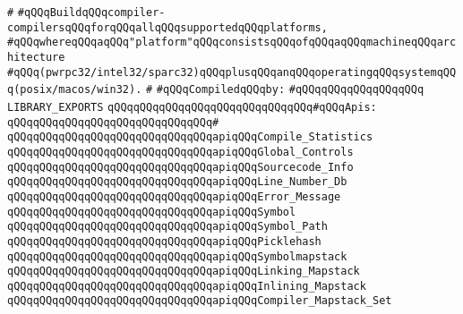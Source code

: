 \label{src/lib/core/compiler/mythryl-compiler-compilers-for-all-supported-platforms.lib}
\verb|#|\newline
\verb|#qQQqBuildqQQqcompiler-compilersqQQqforqQQqallqQQqsupportedqQQqplatforms,|\newline
\verb|#qQQqwhereqQQqaqQQq"platform"qQQqconsistsqQQqofqQQqaqQQqmachineqQQqarchitecture|\newline
\verb|#qQQq(pwrpc32/intel32/sparc32)qQQqplusqQQqanqQQqoperatingqQQqsystemqQQq(posix/macos/win32).|\newline
\verb|#|\newline
\newline
\verb|#qQQqCompiledqQQqby:|\newline
\verb|#qQQqqQQqqQQqqQQqqQQq|\newline
\newline
\newline
\verb|LIBRARY_EXPORTS|\newline
\newline
\verb|qQQqqQQqqQQqqQQqqQQqqQQqqQQqqQQq#qQQqApis:|\newline
\verb|qQQqqQQqqQQqqQQqqQQqqQQqqQQqqQQq#|\newline
\verb|qQQqqQQqqQQqqQQqqQQqqQQqqQQqqQQqapiqQQqCompile_Statistics|\newline
\verb|qQQqqQQqqQQqqQQqqQQqqQQqqQQqqQQqapiqQQqGlobal_Controls|\newline
\verb|qQQqqQQqqQQqqQQqqQQqqQQqqQQqqQQqapiqQQqSourcecode_Info|\newline
\verb|qQQqqQQqqQQqqQQqqQQqqQQqqQQqqQQqapiqQQqLine_Number_Db|\newline
\verb|qQQqqQQqqQQqqQQqqQQqqQQqqQQqqQQqapiqQQqError_Message|\newline
\verb|qQQqqQQqqQQqqQQqqQQqqQQqqQQqqQQqapiqQQqSymbol|\newline
\verb|qQQqqQQqqQQqqQQqqQQqqQQqqQQqqQQqapiqQQqSymbol_Path|\newline
\verb|qQQqqQQqqQQqqQQqqQQqqQQqqQQqqQQqapiqQQqPicklehash|\newline
\verb|qQQqqQQqqQQqqQQqqQQqqQQqqQQqqQQqapiqQQqSymbolmapstack|\newline
\verb|qQQqqQQqqQQqqQQqqQQqqQQqqQQqqQQqapiqQQqLinking_Mapstack|\newline
\verb|qQQqqQQqqQQqqQQqqQQqqQQqqQQqqQQqapiqQQqInlining_Mapstack|\newline
\verb|qQQqqQQqqQQqqQQqqQQqqQQqqQQqqQQqapiqQQqCompiler_Mapstack_Set|\newline
